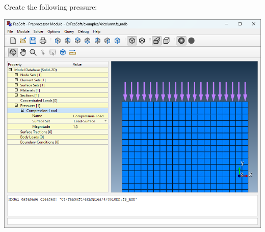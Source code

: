 \documentclass[
    11pt,        %
    a4paper,     %
    final,       %
    fleqn,       %
    notitlepage, %
    onecolumn,   %
    oneside,     %
]{article}
\begin{document}
Create the following pressure:
\begin{center}
\end{center}
\begin{center}
    \includegraphics[scale=0.5]{fig/ui-4-7.png}
\end{center}
\end{document}
